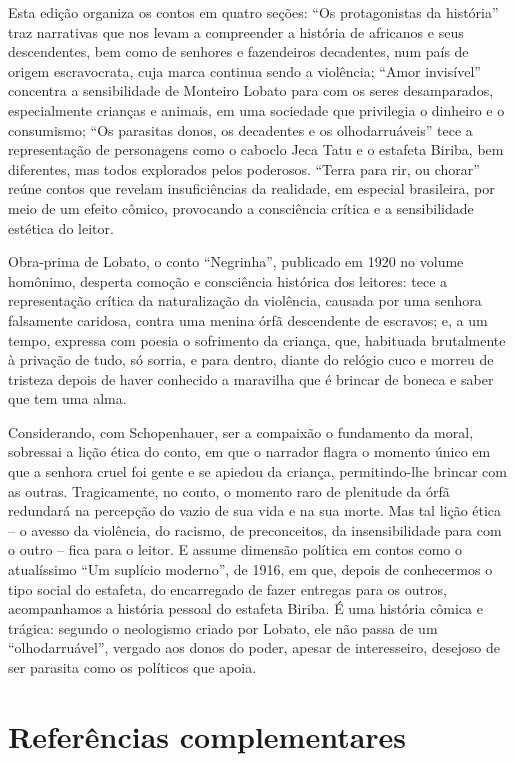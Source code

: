 \documentclass[12pt]{extarticle}
\begin{document}
Esta edição organiza os contos em quatro seções: ``Os protagonistas da
história'' traz narrativas que nos levam a compreender a história de
africanos e seus descendentes, bem como de senhores e fazendeiros
decadentes, num país de origem escravocrata, cuja marca continua sendo a
violência; ``Amor invisível'' concentra a sensibilidade de Monteiro
Lobato para com os seres desamparados, especialmente crianças e animais,
em uma sociedade que privilegia o dinheiro e o consumismo; ``Os
parasitas donos, os decadentes e os olhodarruáveis'' tece a
representação de personagens como o caboclo Jeca Tatu e o estafeta
Biriba, bem diferentes, mas todos explorados pelos poderosos. ``Terra
para rir, ou chorar'' reúne contos que revelam insuficiências da
realidade, em especial brasileira, por meio de um efeito cômico,
provocando a consciência crítica e a sensibilidade estética do leitor.

Obra-prima de Lobato, o conto ``Negrinha'', publicado em 1920 no volume
homônimo, desperta comoção e consciência histórica dos leitores: tece a
representação crítica da naturalização da violência, causada por uma
senhora falsamente caridosa, contra uma menina órfã descendente de
escravos; e, a um tempo, expressa com poesia o sofrimento da criança,
que, habituada brutalmente à privação de tudo, só sorria, e para dentro,
diante do relógio cuco e morreu de tristeza depois de haver conhecido a
maravilha que é brincar de boneca e saber que tem uma alma.

Considerando, com Schopenhauer, ser a compaixão o fundamento da moral,
sobressai a lição ética do conto, em que o narrador flagra o momento
único em que a senhora cruel foi gente e se apiedou da criança,
permitindo-lhe brincar com as outras. Tragicamente, no conto, o momento
raro de plenitude da órfã redundará na percepção do vazio de sua vida e
na sua morte. Mas tal lição ética -- o avesso da violência, do racismo,
de preconceitos, da insensibilidade para com o outro -- fica para o
leitor. E assume dimensão política em contos como o atualíssimo ``Um
suplício moderno'', de 1916, em que, depois de conhecermos o tipo social
do estafeta, do encarregado de fazer entregas para os outros,
acompanhamos a história pessoal do estafeta Biriba. É uma história
cômica e trágica: segundo o neologismo criado por Lobato, ele não passa
de um ``olhodarruável'', vergado aos donos do poder, apesar de
interesseiro, desejoso de ser parasita como os políticos que apoia.

\section{Referências complementares}
\end{document}
